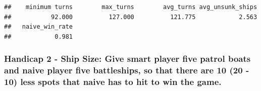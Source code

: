\documentclass[
]{article}
\newenvironment{Shaded}{\begin{snugshade}}{\end{snugshade}}
\newcommand{\DecValTok}[1]{\textcolor[rgb]{0.00,0.00,0.81}{#1}}
\newcommand{\FunctionTok}[1]{\textcolor[rgb]{0.13,0.29,0.53}{\textbf{#1}}}
\newcommand{\NormalTok}[1]{#1}
\newcommand{\OtherTok}[1]{\textcolor[rgb]{0.56,0.35,0.01}{#1}}
\newcommand{\SpecialCharTok}[1]{\textcolor[rgb]{0.81,0.36,0.00}{\textbf{#1}}}
\newcommand{\StringTok}[1]{\textcolor[rgb]{0.31,0.60,0.02}{#1}}
\begin{document}
\begin{Shaded}
\end{Shaded}

\begin{verbatim}
##    minimum turns        max_turns        avg_turns avg_unsunk_ships 
##           92.000          127.000          121.775            2.563 
##   naive_win_rate 
##            0.981
\end{verbatim}

\subsubsection{Handicap 2 - Ship Size: Give smart player five patrol
boats and naive player five battleships, so that there are 10 (20 - 10)
less spots that naive has to hit to win the
game.}\label{handicap-2---ship-size-give-smart-player-five-patrol-boats-and-naive-player-five-battleships-so-that-there-are-10-20---10-less-spots-that-naive-has-to-hit-to-win-the-game.}
\end{document}
